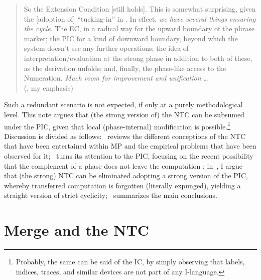 \documentclass[output=paper]{langsci/langscibook}
\begin{document}
\blockquote{So the Extension Condition [still holds]. This is somewhat
    surprising, given the [adoption of] “tucking-in” in \citet{Chomsky2000}. In
    effect, \emph{we have several things ensuring the cycle}. The
    \gls{EC}, in a radical way for the upward boundary of the
    phrase marker; the \gls{PIC} for a kind of downward boundary, beyond which
    the system doesn’t see any further operations; the idea of
    interpretation/evaluation at the strong phase in addition to both of these,
as the derivation unfolds; and, finally, the phase-like access to the
Numeration.  \emph{Much room for improvement and unification} \dots{}\\
\hspace*{\fill}(\citealt{Uriagereka1999b}, my emphasis)}

Such a redundant scenario is not expected, if only at a purely methodological
level. This note argues that (the strong version of) the \gls{NTC} can be
subsumed under the \gls{PIC}, given that local (phase-internal) modification is
possible.\footnote{Probably, the same can be said of the \gls{IC}, by simply
observing that labels, indices, traces, and similar devices are not part of any
I-language.} Discussion is divided as follows:~ reviews the different
conceptions of the \gls{NTC} that have been entertained within \gls{MP} and the
empirical problems that have been observed for it;~ turns its
attention to the \gls{PIC}, focusing on the recent possibility that the
complement of a phase does not leave the computation
\parencite{Chomsky2008,Chomsky2016}; in~, I argue that (the strong)
\gls{NTC} can be eliminated adopting a strong version of the \gls{PIC}, whereby
transferred computation is forgotten (literally expunged), yielding a straight
version of strict cyclicity;~ summarizes the main conclusions.

\section{Merge and the NTC}\label{sec:34.2}
\end{document}
